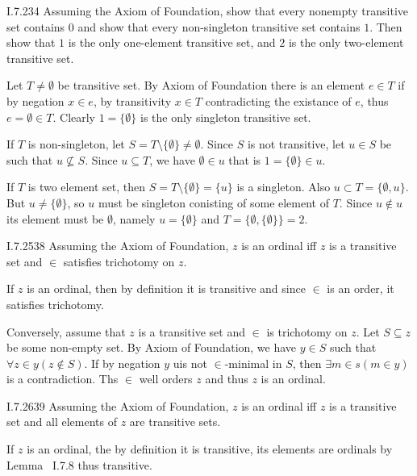 \begin{lexcopy}{I.7.2}{34}
Assuming the Axiom of Foundation, show that every 
nonempty transitive set contains $0$ and show that every non-singleton
transitive
set contains $1$. Then show that $1$ is the only one-element transitive set,
and $2$
is the only two-element transitive set.
\end{lexcopy}

Let \(T\neq\emptyset\) be transitive set.
By Axiom of Foundation there is an
element \(e\in T\) if by negation \(x\in e\),
by transitivity \(x\in T\) contradicting the existance of $e$,
thus \(e = \emptyset \in T\).
Clearly \(1= \{\emptyset\}\) is the only singleton transitive set.

If $T$ is non-singleton, let \(S = T \setminus \{\emptyset\} \neq \emptyset\).
Since $S$ is not transitive, let \(u \in S\)
be such that \(u \not\subseteq S\).
Since \(u\subseteq T\), we have \(\emptyset \in u\)
that is \(1 = \{\emptyset\} \in u\).

If $T$ is two element set,
then \(S = T \setminus \{\emptyset\}=\{u\}\) is a singleton.
Also \(u \subset T = \{\emptyset, u\}\).
But \(u \neq \{\emptyset\}\),
so $u$ must be singleton conisting of some element of $T$.
Since \(u\notin u\) its element must be \(\emptyset\),
namely \(u = \{\emptyset\}\) and
\(T = \{\emptyset, \{\emptyset\}\} = 2\).

\begin{lexcopy}{I.7.25}{38}
  Assuming the Axiom of Foundation, $z$ is an ordinal iff $z$ is
  a transitive set and \(\in\) satisfies trichotomy on $z$.
\end{lexcopy}

If $z$ is an ordinal, then by definition it is transitive
and since  \(\in\) is an order, it satisfies trichotomy.

Conversely, assume that  $z$ is  a transitive set
and \(\in\) is trichotomy on $z$.
Let \(S\subseteq z\) be some non-empty set. By Axiom of Foundation,
we have \(y \in S\) such that \(\forall z\in y (z\notin S)\).
If by negation $y$ uis not \(\in\)-minimal in $S$,
then \(\exists m\in s(m\in y)\) is a contradiction.
Ths \(\in\) well orders $z$ and thus $z$ is an ordinal.


\begin{lexcopy}{I.7.26}{39}
  Assuming the Axiom of Foundation, $z$ is an ordinal iff $z$ is
a transitive set and all elements of $z$ are transitive sets.
\end{lexcopy}

If $z$ is an ordinal, the by definition it is transitive,
its elements are ordinals by Lemma~ I.7.8 thus transitive.

